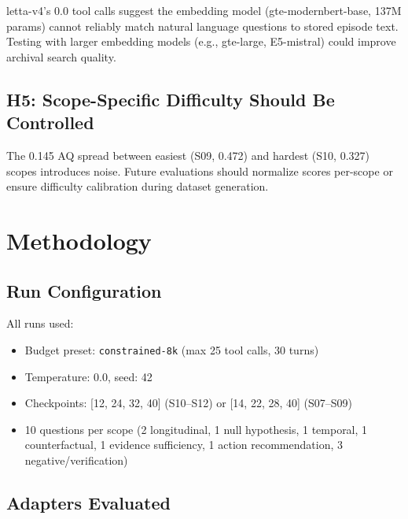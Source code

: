 \documentclass[11pt,a4paper]{article}
\begin{document}
letta-v4's 0.0 tool calls suggest the embedding model (gte-modernbert-base, 137M params) cannot reliably match natural language questions to stored episode text.
Testing with larger embedding models (e.g., gte-large, E5-mistral) could improve archival search quality.

\subsection{H5: Scope-Specific Difficulty Should Be Controlled}

The 0.145 AQ spread between easiest (S09, 0.472) and hardest (S10, 0.327) scopes introduces noise.
Future evaluations should normalize scores per-scope or ensure difficulty calibration during dataset generation.

\section{Methodology}

\subsection{Run Configuration}

All runs used:
\begin{itemize}[nosep]
  \item Budget preset: \texttt{constrained-8k} (max 25 tool calls, 30 turns)
  \item Temperature: 0.0, seed: 42
  \item Checkpoints: [12, 24, 32, 40] (S10--S12) or [14, 22, 28, 40] (S07--S09)
  \item 10 questions per scope (2 longitudinal, 1 null hypothesis, 1 temporal, 1 counterfactual, 1 evidence sufficiency, 1 action recommendation, 3 negative/verification)
\end{itemize}

\subsection{Adapters Evaluated}
\end{document}
